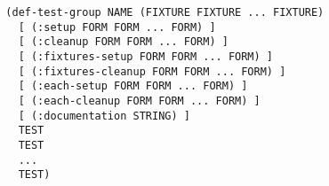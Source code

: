 \begin{verbatim}
  (def-test-group NAME (FIXTURE FIXTURE ... FIXTURE)
    [ (:setup FORM FORM ... FORM) ]
    [ (:cleanup FORM FORM ... FORM) ]
    [ (:fixtures-setup FORM FORM ... FORM) ]
    [ (:fixtures-cleanup FORM FORM ... FORM) ]
    [ (:each-setup FORM FORM ... FORM) ]
    [ (:each-cleanup FORM FORM ... FORM) ]
    [ (:documentation STRING) ]
    TEST
    TEST
    ...
    TEST)
\end{verbatim}
